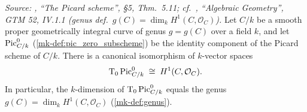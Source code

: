 \begin{theorem}\label{mk-thm:pic0_tangent_space_iso}
  \leanok

  \textit{Source: \cite{kleiman-picard}, ``The Picard scheme'', \S 5,
  Thm.~5.11; cf.\ \cite{hartshorne-ag}, ``Algebraic Geometry'', GTM 52,
  IV.1.1 (genus def.\ \(g(C) = \dim_k H^1(C, \mathcal{O}_C)\)).}
  Let \(C/k\) be a smooth proper geometrically integral curve of genus
  \(g = g(C)\) over a field \(k\), and let \(\operatorname{Pic}^0_{C/k}\)
  (\ref{mk-def:pic_zero_subscheme}) be the identity component of the
  Picard scheme of \(C/k\). There is a canonical isomorphism of
  \(k\)-vector spaces
  \[
    \textup T_0 \operatorname{Pic}^0_{C/k} \;\cong\; H^1(C, \mathcal{O}_C).
  \]
  In particular, the \(k\)-dimension of \(\textup T_0 \operatorname{Pic}^0_{C/k}\) equals
  the genus \(g(C) = \dim_k H^1(C, \mathcal{O}_C)\)
  (\ref{mk-def:genus}).
\end{theorem}
